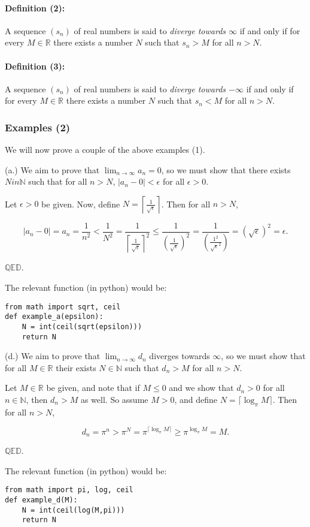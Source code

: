 \documentclass[]{article}
\begin{document}
\paragraph{Definition (2):}

A sequence $(s_n)$ of real numbers is said to \emph{diverge towards
$\infty$} if and only if for every $M \in \mathbb{R}$ there exists a
number $N$ such that $s_n > M$ for all $n > N$.

\paragraph{Definition (3):}

A sequence $(s_n)$ of real numbers is said to \emph{diverge towards
$-\infty$} if and only if for every $M \in \mathbb{R}$ there exists a
number $N$ such that $s_n < M$ for all $n > N$.

\subsubsection{Examples (2)}

We will now prove a couple of the above examples (1).

(a.) We aim to prove that $\lim_{n \to \infty} a_n = 0$, so we must show
that there exists $N in \mathbb{N}$ such that for all $n >N$,
$\vert a_n - 0\vert  < \epsilon$ for all $\epsilon > 0$.

Let $\epsilon > 0$ be given. Now, define
$N = \left \lceil \frac{1}{\sqrt{\epsilon}} \right \rceil $. Then for
all $n > N$,

\[\vert a_n - 0\vert  = a_n = \frac{1}{n^2} < \frac{1}{N^2} = \frac{1}{\left \lceil \frac{1}{\sqrt{\epsilon}} \right \rceil^2} \le \frac{1}{\left (\frac{1}{\sqrt{\epsilon}} \right )^2} = \frac{1}{\left (\frac{1^2}{\sqrt{\epsilon}^2} \right )} = \left( \sqrt{\epsilon} \right)^2 = \epsilon.\]

$\mathbb{QED}$.

The relevant function (in python) would be:

\begin{verbatim}
from math import sqrt, ceil
def example_a(epsilon):
    N = int(ceil(sqrt(epsilon)))
    return N
\end{verbatim}

(d.) We aim to prove that $\lim_{n \to \infty} d_n$ diverges towards
$\infty$, so we must show that for all $M \in \mathbb{R}$ their exists
$N \in \mathbb{N}$ such that $d_n > M$ for all $n > N$.

Let $M \in \mathbb{R}$ be given, and note that if $M \le 0$ and we show
that $d_n > 0$ for all $n \in \mathbb{N}$, then $d_n > M$ as well. So
assume $M > 0$, and define $N = \lceil \log_{\pi} M \rceil $. Then for
all $n > N$,

\[ d_n = \pi^n > \pi^N = \pi^{\lceil \log_{\pi} M \rceil} \ge \pi^{ \log_{\pi} M } = M. \]

$\mathbb{QED}$.

The relevant function (in python) would be:

\begin{verbatim}
from math import pi, log, ceil
def example_d(M):
    N = int(ceil(log(M,pi)))
    return N
\end{verbatim}
\end{document}
